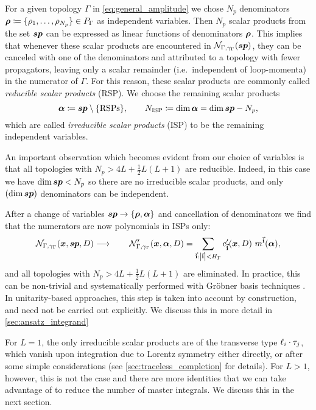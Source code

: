 For a given topology $\Gamma$ in \cref{eq:general_amplitude} we chose $N_p$ denominators $\vb*{\rho}\coloneqq\{\rho_1,\ldots,\rho_{N_p}\} \in P_\Gamma$ as
independent variables. Then $N_p$ scalar products from the set $\vb*{sp}$
can be expressed as linear functions of denominators $\vb*{\rho}$.
This implies that whenever these scalar products are encountered in $\mathcal{N}_{\Gamma,\gamma_\Gamma}\qty(\vb*{sp})$,
they can be canceled with one of the denominators and attributed to a topology with fewer propagators,
leaving only a scalar remainder (i.e.\ independent of loop-momenta) in the numerator of $\Gamma$.
For this reason, these scalar products are commonly called \emph{reducible scalar products} (RSP).
We choose the remaining scalar products
\begin{equation}
  \vb*{\alpha} \coloneqq \vb*{sp} \setminus \{\text{RSPs}\} , \qquad N_\text{ISP} \coloneqq \dim{\vb*{\alpha}}   =  \dim{\vb*{sp}}-N_p,
\end{equation}
which are called
\emph{irreducible scalar products} (ISP) to be the remaining independent variables.

An important observation which becomes evident from our choice of variables is that all topologies with $N_p> 4 L +\frac{1}{2}L(L+1)$ are reducible.
Indeed, in this case we have $\dim\vb*{sp} < N_p$ so there are no irreducible scalar products, and only $(\dim\vb*{sp})$ denominators can be independent.

After a change of variables $\vb*{sp}\to \{\vb*{\rho},\vb*{\alpha}\}$ and cancellation of denominators
we find that the numerators are now polynomials in ISPs only:
\begin{equation} \label{eq:rsp_reduction}
  \mathcal{N}_{\Gamma,\gamma_\Gamma}(\vb*{x}, \vb*{sp}, D) \longrightarrow \qquad
    \mathcal{N}^{\prime}_{\Gamma,\gamma_\Gamma}(\vb*{x}, \vb*{\alpha}, D) =
    \sum_{\va{i} : \abs{\va{i}} < H_{\Gamma}} c^{\prime}_{\va{i}} (\vb*{x},D)~ m^{\va{i}}(\vb*{\alpha}),
\end{equation}
and all topologies with $N_p > 4L +\frac{1}{2}L(L+1)$ are eliminated.
In practice, this can be non-trivial and systematically performed with Gröbner basis techniques \cite{Zhang:2012ce,Mastrolia:2012wf,Mastrolia:2012an,Mastrolia:2016dhn}.
In unitarity-based approaches, this step is taken into account by construction,
and need not be carried out explicitly. We discuss this in more detail in \cref{sec:ansatz_integrand}

For $L=1$, the only irreducible scalar products are of the transverse type $\sp(\ell_i, \tau_j)$, which vanish upon integration due to Lorentz symmetry either directly,
or after some simple considerations (see \cref{sec:traceless_completion} for details).
For $L>1$, however, this is not the case and there are more identities that we can take advantage of to reduce the number of master integrals.
We discuss this in the next section.

